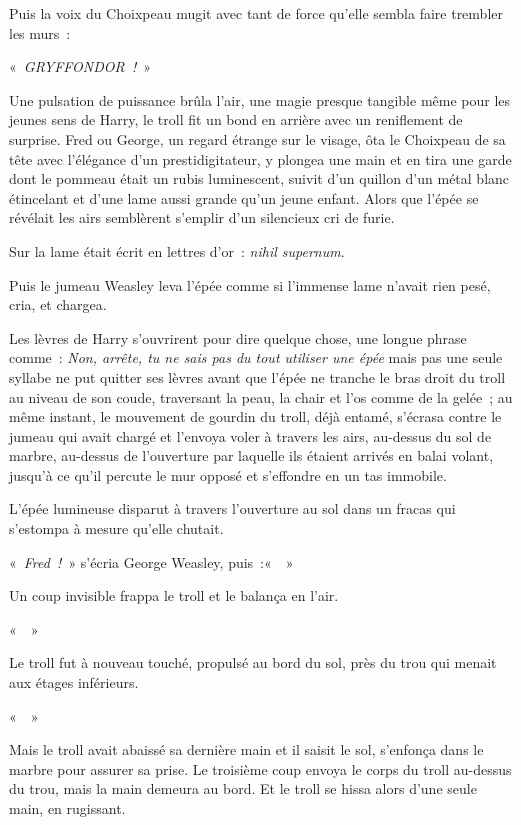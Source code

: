 Puis la voix du Choixpeau mugit avec tant de force qu'elle sembla faire trembler les murs~:

«~\emph{GRYFFONDOR~!}~»

Une pulsation de puissance brûla l'air, une magie presque tangible même pour les jeunes sens de Harry, le troll fit un bond en arrière avec un reniflement de surprise. Fred ou George, un regard étrange sur le visage, ôta le Choixpeau de sa tête avec l'élégance d'un prestidigitateur, y plongea une main et en tira une garde dont le pommeau était un rubis luminescent, suivit d'un quillon d'un métal blanc étincelant et d'une lame aussi grande qu'un jeune enfant. Alors que l'épée se révélait les airs semblèrent s'emplir d'un silencieux cri de furie.

Sur la lame était écrit en lettres d'or~: \emph{nihil supernum}.

Puis le jumeau Weasley leva l'épée comme si l'immense lame n'avait rien pesé, cria, et chargea.

Les lèvres de Harry s'ouvrirent pour dire quelque chose, une longue phrase comme~: \emph{Non, arrête, tu ne sais pas du tout utiliser une épée} mais pas une seule syllabe ne put quitter ses lèvres avant que l'épée ne tranche le bras droit du troll au niveau de son coude, traversant la peau, la chair et l'os comme de la gelée~; au même instant, le mouvement de gourdin du troll, déjà entamé, s'écrasa contre le jumeau qui avait chargé et l'envoya voler à travers les airs, au-dessus du sol de marbre, au-dessus de l'ouverture par laquelle ils étaient arrivés en balai volant, jusqu'à ce qu'il percute le mur opposé et s'effondre en un tas immobile.

L'épée lumineuse disparut à travers l'ouverture au sol dans un fracas qui s'estompa à mesure qu'elle chutait.

«~\emph{Fred~!}~» s'écria George Weasley, puis~:«~~»

Un coup invisible frappa le troll et le balança en l'air.

«~~»

Le troll fut à nouveau touché, propulsé au bord du sol, près du trou qui menait aux étages inférieurs.

«~~»

Mais le troll avait abaissé sa dernière main et il saisit le sol, s'enfonça dans le marbre pour assurer sa prise. Le troisième coup envoya le corps du troll au-dessus du trou, mais la main demeura au bord. Et le troll se hissa alors d'une seule main, en rugissant.

